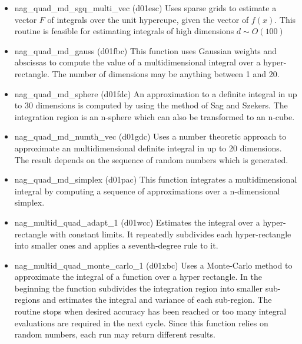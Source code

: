\begin{itemize}
\item nag\_quad\_md\_sgq\_multi\_vec (d01esc) \cite{nag_d01esc} \newline
Uses sparse grids to estimate a vector $F$ of integrals over the unit hypercupe, given the vector of $f(x)$. This routine is feasible  for estimating integrals of high dimensions $d\sim O(100)$

\item nag\_quad\_md\_gauss (d01fbc) \cite{nag_d01fbc} \newline
This function uses Gaussian weights and abscissas to compute the value of a multidimensional integral over a hyper-rectangle. The number of dimensions may be anything between 1 and 20.

\item nag\_quad\_md\_sphere (d01fdc) \cite{nag_d01fdc} \newline
An approximation to a definite integral in up to 30 dimensions is computed by using the method of Sag and Szekers. The integration region is an n-sphere which can also be transformed to an n-cube.

\item nag\_quad\_md\_numth\_vec (d01gdc) \cite{nag_d01gdc} \newline
Uses a number theoretic approach to approximate an multidimensional definite integral in up to 20 dimensions. The result depends on the sequence of random numbers which is generated.

\item nag\_quad\_md\_simplex (d01pac) \cite{nag_d01pac} \newline
This function integrates a multidimensional integral by computing a sequence of approximations over a n-dimensional simplex.

\item nag\_multid\_quad\_adapt\_1 (d01wcc) \cite{nag_d01wcc} \newline
Estimates the integral over a hyper-rectangle with constant limits. It repeatedly subdivides each hyper-rectangle into smaller ones and applies a seventh-degree rule to it.

\item nag\_multid\_quad\_monte\_carlo\_1 (d01xbc) \cite{nag_d01xbc} \newline
Uses a Monte-Carlo method to approximate the integral of a function over a hyper rectangle. In the beginning the function subdivides the integration region into smaller sub-regions and estimates the integral and variance of each sub-region. The routine stops when desired accuracy has been reached or too many integral evaluations are required in the next cycle. Since this function relies on random numbers, each run may return different results.
		
\end{itemize}






